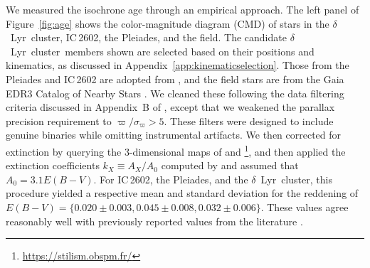 \documentclass[12pt,modern,twocolumn,tighten]{aastex63}
\newcommand{\cn}{$\delta$\ Lyr\ cluster} %
\begin{document}
We measured the isochrone age through an empirical approach.  The left
panel of Figure~\ref{fig:age} shows the color-magnitude diagram (CMD)
of stars in the \cn, IC\,2602, the Pleiades, and the field.  The
candidate \cn\ members shown are
selected based on their positions and
kinematics, as discussed in Appendix~\ref{app:kinematicselection}.
Those from the Pleiades and IC\,2602 are adopted from
\citet{cantatgaudin_gaia_2018}, and the field stars are from the Gaia
EDR3 Catalog of Nearby Stars \citep{gaia_gcns_2021}.  We cleaned these
following the data filtering criteria discussed in Appendix~B of
\citet{GaiaCollaboration2018}, except that we weakened the parallax
precision requirement to $\varpi/\sigma_\varpi>5$.  These filters were
designed to include genuine binaries while omitting instrumental
artifacts.  We then corrected for extinction by querying the
3-dimensional maps of \citet{capitanio_threedimensional_2017} and
\citet{lallement_threedimensional_2018}\footnote{\url{https://stilism.obspm.fr/}},
and then applied the extinction coefficients $k_X\equiv A_X/A_0$
computed by \citet{GaiaCollaboration2018} and assumed that $A_0 =
3.1 E(B-V)$.  For IC\,2602, the Pleiades, and the \cn, this procedure
yielded a respective mean and standard deviation for the reddening of
$E(B-V)=\{0.020\pm0.003, 0.045\pm0.008, 0.032\pm0.006\}$.  These
values agree reasonably well with previously reported values from the
literature \citep[{\it
e.g.},][]{GaiaCollaboration2018,kounkel_untangling_2019,bossini_age_2019}.

%
%
%
\end{document}
